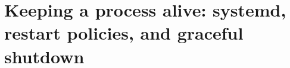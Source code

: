 \chapter{Keeping a process alive: systemd, restart policies, and graceful shutdown}
\label{ch:keeping-a-process-alive-systemd-restart}

